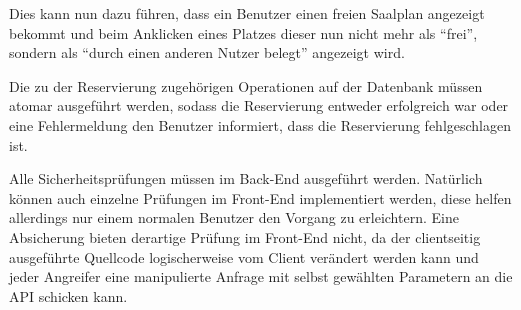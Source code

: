 Dies kann nun dazu führen, dass ein Benutzer einen freien Saalplan angezeigt bekommt und beim Anklicken eines Platzes dieser nun nicht mehr als \enquote{frei}, sondern als \enquote{durch einen anderen Nutzer belegt} angezeigt wird.

Die zu der Reservierung zugehörigen Operationen auf der Datenbank müssen atomar ausgeführt werden, sodass die Reservierung entweder erfolgreich war oder eine Fehlermeldung den Benutzer informiert, dass die Reservierung fehlgeschlagen ist.

Alle Sicherheitsprüfungen müssen im Back-End ausgeführt werden.
Natürlich können auch einzelne Prüfungen im Front-End implementiert werden, diese helfen allerdings nur einem normalen Benutzer den Vorgang zu erleichtern.
Eine Absicherung bieten derartige Prüfung im Front-End nicht, da der clientseitig ausgeführte Quellcode logischerweise vom Client verändert werden kann und jeder Angreifer eine manipulierte Anfrage mit selbst gewählten Parametern an die \acs{API} schicken kann.